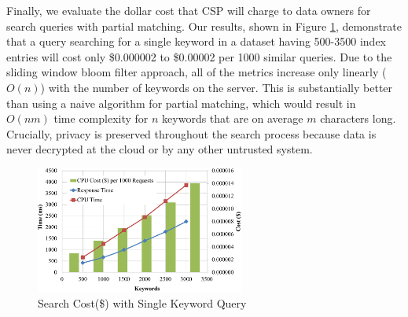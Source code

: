 Finally, we evaluate the dollar cost that CSP will charge to data owners for search
queries with partial matching. 
Our results, shown in Figure \ref{fig:cost_single_query}, demonstrate that a query
searching for a single keyword in a dataset having 500-3500 index entries will cost only 
\$0.000002 to \$0.00002 per 1000 similar
queries. Due to the sliding window bloom filter approach, 
all of the metrics increase only linearly ($O(n)$) with the number
of keywords on the server. This is substantially better than using a naive algorithm 
for partial matching, which would result in $O(nm)$ time complexity 
for $n$ keywords that are on average $m$ characters long. Crucially,
privacy is preserved throughout the search process because data is never
decrypted at the cloud or by any other untrusted system.


\begin{figure}
  \centering
  \includegraphics[width=2.7in]{figures/cost_keywords_graph.png}
  \vspace{-10px}
  \caption{Search Cost(\$) with Single Keyword Query}
  \label{fig:cost_single_query}
\end{figure}
